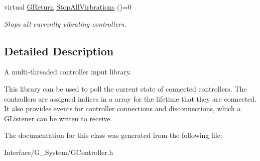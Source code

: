 \begin{DoxyCompactItemize}
\mbox{\label{classGW_1_1SYSTEM_1_1GController_aea5a523d30ebedb5d9923d61d77f1583}} 
virtual \mbox{\hyperlink{namespaceGW_a67a839e3df7ea8a5c5686613a7a3de21}{G\+Return}} \mbox{\hyperlink{classGW_1_1SYSTEM_1_1GController_aea5a523d30ebedb5d9923d61d77f1583}{Stop\+All\+Virbrations}} ()=0
\begin{DoxyCompactList}\small\item\em Stops all currently vibrating controllers. \end{DoxyCompactList}\end{DoxyCompactItemize}


\subsection{Detailed Description}
A multi-\/threaded controller input library. 

This library can be used to poll the current state of connected controllers. The controllers are assigned indices in a array for the lifetime that they are connected. It also provides events for controller connections and disconnections, which a G\+Listener can be writen to receive. 

The documentation for this class was generated from the following file\+:\begin{DoxyCompactItemize}
\item 
Interface/\+G\+\_\+\+System/G\+Controller.\+h\end{DoxyCompactItemize}
